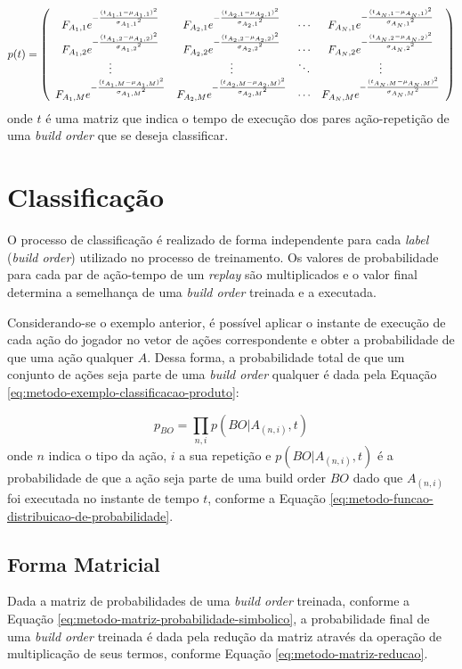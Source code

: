 \begin{equation}
	p(t) = \left(
		\begin{array}{cccc}
			 {F_{{A_1,1}}} e^{-\frac{(t_{{A_1,1}}-{\mu_{{A_1,1}}})^2}{{{\sigma_{{A_1,1}}}}^2}}  &  {F_{{A_2,1}}} e^{-\frac{(t_{{A_2,1}}-{\mu_{{A_2,1}}})^2}{{{\sigma_{{A_2,1}}}}^2}}  & \cdots &  {F_{{A_N,1}}} e^{-\frac{(t_{{A_N,1}}-{\mu_{{A_N,1}}})^2}{{{\sigma_{{A_N,1}}}}^2}}  \\
 			 {F_{{A_1,2}}} e^{-\frac{(t_{{A_1,2}}-{\mu_{{A_1,2}}})^2}{{{\sigma_{{A_1,2}}}}^2}}  &  {F_{{A_2,2}}} e^{-\frac{(t_{{A_2,2}}-{\mu_{{A_2,2}}})^2}{{{\sigma_{{A_2,2}}}}^2}}  & \cdots &  {F_{{A_N,2}}} e^{-\frac{(t_{{A_N,2}}-{\mu_{{A_N,2}}})^2}{{{\sigma_{{A_N,2}}}}^2}}  \\
 			\vdots 	  	  & \vdots 	  	  & \ddots & \vdots 	       \\
 			 {F_{{A_1,M}}} e^{-\frac{(t_{{A_1,M}}-{\mu_{{A_1,M}}})^2}{{{\sigma_{{A_1,M}}}}^2}}  &  {F_{{A_2,M}}} e^{-\frac{(t_{{A_2,M}}-{\mu_{{A_2,M}}})^2}{{{\sigma_{{A_2,M}}}}^2}}  & \cdots &  {F_{{A_N,M}}} e^{-\frac{(t_{{A_N,M}}-{\mu_{{A_N,M}}})^2}{{{\sigma_{{A_N,M}}}}^2}} 
		\end{array}
	\right)
	\label{eq:metodo-matriz-probabilidade-simbolico}
\end{equation}
\noindent onde $t$ é uma matriz que indica o tempo de execução dos pares ação-repetição de uma \textit{build order} que se deseja classificar.

\section{Classificação}
O processo de classificação é realizado de forma independente para cada \textit{label} (\textit{build order}) utilizado no processo de treinamento. Os valores de probabilidade para cada par de ação-tempo de um \textit{replay} são multiplicados e o valor final determina a semelhança de uma \textit{build order} treinada e a executada.

Considerando-se o exemplo anterior, é possível aplicar o instante de execução de cada ação do jogador no vetor de ações correspondente e obter a probabilidade de que uma ação qualquer $A$. Dessa forma, a probabilidade total de que um conjunto de ações seja parte de uma \textit{build order} qualquer é dada pela Equação \ref{eq:metodo-exemplo-classificacao-produto}:

\begin{equation}
	p_{BO} = \prod_{n,i} p(BO|A_{(n,i)}, t)
	\label{eq:metodo-exemplo-classificacao-produto}
\end{equation}
\noindent onde $n$ indica o tipo da ação, $i$ a sua repetição e $p(BO|A_{(n,i)}, t)$ é a probabilidade de que a ação seja parte de uma build order $BO$ dado que $A_{(n,i)}$ foi executada no instante de tempo $t$, conforme a Equação \ref{eq:metodo-funcao-distribuicao-de-probabilidade}.

\subsection{Forma Matricial}
Dada a matriz de probabilidades de uma \textit{build order} treinada, conforme a Equação \ref{eq:metodo-matriz-probabilidade-simbolico}, a probabilidade final de uma \textit{build order} treinada é dada pela redução da matriz através da operação de multiplicação de seus termos, conforme Equação \ref{eq:metodo-matriz-reducao}.

